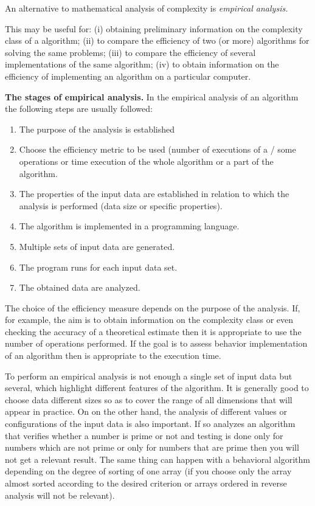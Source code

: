 \documentclass[a4paper, 12pt]{article}
\begin{document}
An alternative to mathematical analysis of complexity is \textit{empirical analysis.}

This may be useful for: (i) obtaining preliminary information on the complexity class of a
algorithm; (ii) to compare the efficiency of two (or more) algorithms for solving the same
problems; (iii) to compare the efficiency of several implementations of the same algorithm; (iv) to
obtain information on the efficiency of implementing an algorithm on a particular computer.

\textbf{The stages of empirical analysis.} In the empirical analysis of an algorithm the following steps are usually followed:

\begin{enumerate}
  \item The purpose of the analysis is established
  \item Choose the efficiency metric to be used (number of executions of a / some operations or time
  execution of the whole algorithm or a part of the algorithm.
  \item The properties of the input data are established in relation to which the analysis is performed (data size
  or specific properties).
  \item The algorithm is implemented in a programming language.
  \item Multiple sets of input data are generated.
  \item The program runs for each input data set.
  \item The obtained data are analyzed.
\end{enumerate}

The choice of the efficiency measure depends on the purpose of the analysis. If, for example, the aim is to obtain
information on the complexity class or even checking the accuracy of a theoretical estimate then
it is appropriate to use the number of operations performed. If the goal is to assess behavior
implementation of an algorithm then is appropriate to the execution time.

To perform an empirical analysis is not enough a single set of input data but several, which
highlight different features of the algorithm. It is generally good to choose data
different sizes so as to cover the range of all dimensions that will appear in practice. On
on the other hand, the analysis of different values or configurations of the input data is also important. If so
analyzes an algorithm that verifies whether a number is prime or not and testing is done only for numbers
which are not prime or only for numbers that are prime then you will not get a relevant result.
The same thing can happen with a behavioral algorithm depending on the degree of sorting of one
array (if you choose only the array almost sorted according to the desired criterion or arrays ordered in reverse
analysis will not be relevant).
\end{document}
